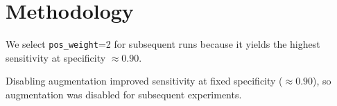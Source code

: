 \section{Methodology}



We select \texttt{pos\_weight}=2 for subsequent runs because it yields the highest sensitivity at specificity $\approx 0.90$.



Disabling augmentation improved sensitivity at fixed specificity ($\approx 0.90$), so augmentation was disabled for subsequent experiments.

